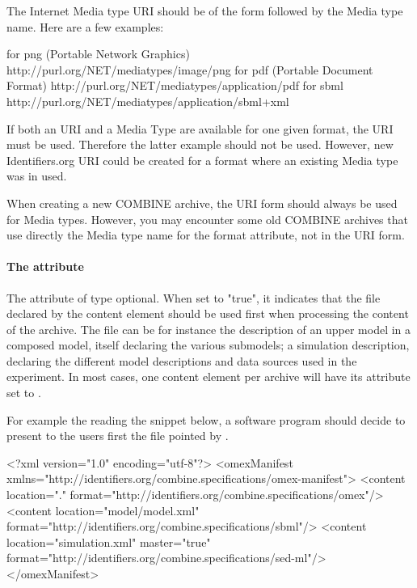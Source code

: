 The Internet Media type  URI should be of the form 
followed by the Media type name. Here are a few examples:

\begin{example}
    for png (Portable Network Graphics) http://purl.org/NET/mediatypes/image/png
    for pdf (Portable Document Format) http://purl.org/NET/mediatypes/application/pdf
    for sbml http://purl.org/NET/mediatypes/application/sbml+xml
\end{example}

If both an  URI and a Media Type are available for one given format, the
 URI must be used. Therefore the latter example should not be used. However, new Identifiers.org URI could be created for a format where an existing Media type was in used.

When creating a new COMBINE archive, the URI form should always be used for Media types. However, you may encounter some
old COMBINE archives that use directly the Media type name for the format attribute, not in the URI form.

\paragraph{The  attribute}
\label{active_document}
The  attribute of type  optional. When set to "true", it 
indicates that the file declared by the content element should be used first when 
processing the content of the archive. The file can be for instance the description of an upper model in a 
composed model, itself declaring the various submodels; a simulation description, 
declaring the different model descriptions and data sources used in the 
experiment. In most cases, one content element per archive will have its  
attribute set to .

For example the reading the snippet below, a software program should decide to present to the users first the file pointed by  .

\begin{example}
<?xml version="1.0" encoding="utf-8"?>
<omexManifest xmlns="http://identifiers.org/combine.specifications/omex-manifest">
    <content location="." format="http://identifiers.org/combine.specifications/omex"/>
    <content location="model/model.xml" 
        format="http://identifiers.org/combine.specifications/sbml"/>
    <content location="simulation.xml" master="true"
        format="http://identifiers.org/combine.specifications/sed-ml"/>
</omexManifest>
\end{example}

